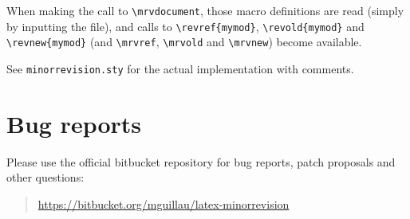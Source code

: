 \documentclass{ltxdoc}
\begin{document}
When making the call to \verb|\mrvdocument|, those macro definitions are read (simply by inputting the file), and calls to \verb|\revref{mymod}|, \verb|\revold{mymod}| and \verb|\revnew{mymod}| (and \verb|\mrvref|, \verb|\mrvold| and \verb|\mrvnew|) become available.

See \verb|minorrevision.sty| for the actual implementation with comments.

\section{Bug reports}

Please use the official bitbucket repository for bug reports, patch proposals and other questions:

\begin{quote}
\url{https://bitbucket.org/mguillau/latex-minorrevision}
\end{quote}
\end{document}
